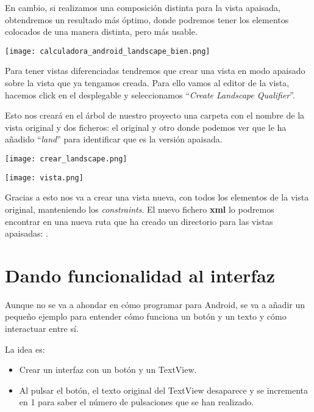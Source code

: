 En cambio, si realizamos una composición distinta para la vista apaisada, obtendremos un resultado más óptimo, donde podremos tener los elementos colocados de una manera distinta, pero más usable.

\begin{center}
    \texttt{[image: calculadora\_android\_landscape\_bien.png]}
\end{center}

Para tener vistas diferenciadas tendremos que crear una vista en modo apaisado sobre la vista que ya tengamos creada. Para ello vamos al editor de la vista, hacemos click en el desplegable y seleccionamos “\textit{Create Landscape Qualifier}”.

Esto nos creará en el árbol de nuestro proyecto una carpeta con el nombre de la vista original y dos ficheros: el original y otro donde podemos ver que le ha añadido “\textit{land}” para identificar que es la versión apaisada.


{
    \hfill
    \begin{minipage}{0.35\linewidth}
        \texttt{[image: crear\_landscape.png]}
    \end{minipage}
    \hfill
    \begin{minipage}{0.35\linewidth}
        \texttt{[image: vista.png]}
    \end{minipage}
    \hfill
}

Gracias a esto nos va a crear una vista nueva, con todos los elementos de la vista original, manteniendo los \textit{constraints}. El nuevo fichero \textbf{xml} lo podremos encontrar en una nueva ruta que ha creado un directorio para las vistas apaisadas: .


\chapter{Dando funcionalidad al interfaz}

Aunque no se va a ahondar en cómo programar para Android, se va a añadir un pequeño ejemplo para entender cómo funciona un botón y un texto y cómo interactuar entre sí.

La idea es:
\begin{itemize}
    \item Crear un interfaz con un botón y un TextView.
    \item Al pulsar el botón, el texto original del TextView desaparece y se incrementa en 1 para saber el número de pulsaciones que se han realizado.
\end{itemize}

